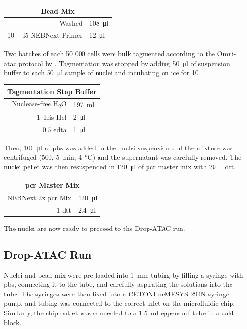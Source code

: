 \begin{appendix}
\begin{multicols}{2}
\begin{center}
\begin{tabular}{r|l}
	\multicolumn{2}{c}{Bead Mix} \\
	\hline
	Washed \acrshortpl{bhb} & \SI{108}{\ul} \\
	\SI{10}{\micro\molar} i5-NEBNext Primer & \SI{12}{\ul} \\
\end{tabular}
\end{center}
\medskip

Two batches of each 50 000 cells were bulk tagmented according to the Omni-\acrshort{atac} protocol by \cite{corces2017}. Tagmentation was stopped by adding \SI{50}{\ul} of suspension buffer to each \SI{50}{\ul} sample of nuclei and incubating on ice for \SI{10}{\min}.\pms

\begin{center}
\begin{tabular}{r|l}
	\multicolumn{2}{c}{Tagmentation Stop Buffer} \\
	\hline
	Nuclease-free H\textsubscript{2}O & \SI{197}{\ml} \\
	\SI{1}{\molar} Tris-Hcl & \SI{2}{\ul} \\
	\SI{0.5}{\molar} \acrshort{edta} & \SI{1}{\ul} \\
\end{tabular}
\end{center}
\medskip

Then, \SI{100}{\ul} of \acrshort{pbs} was added to the nuclei suspension and the mixture was centrifuged (\SI{500}{\rcf}, \SI{5}{\minute}, \SI{4}{\celsius}) and the supernatant was carefully removed. The nuclei pellet was then resuspended in \SI{120}{\ul} of \acrshort{pcr} master mix with \SI{20}{\milli\molar} \acrshort{dtt}.\pms

\begin{center}
\begin{tabular}{r|l}
	\multicolumn{2}{c}{\acrshort{pcr} Master Mix} \\
	\hline
	NEBNext 2x \acrshort{pcr} Mix & \SI{120}{\ul} \\
	\SI{1}{\molar} \acrshort{dtt} & \SI{2.4}{\ul} \\
\end{tabular}
\end{center}
\medskip

The nuclei are now ready to proceed to the Drop-ATAC run.\pms

\subsection{Drop-ATAC Run}
Nuclei and bead mix were pre-loaded into \SI{1}{\mm} tubing by filling a syringe with \acrshort{pbs}, connecting it to the tube, and carefully aspirating the solutions into the tube. The syringes were then fixed into a CETONI neMESYS 290N syringe pump, and tubing was connected to the correct inlet on the microfluidic chip. Similarly, the chip outlet was connected to a \SI{1.5}{\ml} eppendorf tube in a cold block.\pms


\end{multicols}
\end{appendix}
